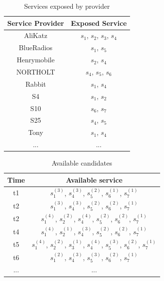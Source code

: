 \documentclass[10pt,journal,compsoc]{IEEEtran}
\begin{document}
\begin{table}[!t]
\renewcommand{\arraystretch}{1.3}
\caption{Services exposed by provider}
\label{Services exposed by provider}
\centering
\begin{tabular}{c c}
\hline
\bfseries Service Provider & \bfseries Exposed Service\\
\hline
AliKatz     & $s_1$, $s_2$, $s_3$, $s_4$\\
BlueRadios  & $s_1$, $s_5$\\
Henrymobile & $s_2$, $s_4$\\
NORTHOLT    & $s_4$, $s_5$, $s_6$ \\
Rabbit      & $s_1$, $s_4$\\
S4          & $s_1$, $s_2$\\
S10         & $s_6$, $s_7$\\
S25         & $s_4$, $s_5$\\
Tony        & $s_1$, $s_4$\\
... & ...\\
\hline
\end{tabular}
\end{table}

\begin{table}[!t]
\renewcommand{\arraystretch}{1.8}
\caption{Available candidates}
\label{Available candidates}
\centering
\begin{tabular}{c c}
\hline
\bfseries Time & \bfseries Available service\\
\hline
t1     & $s_1^{(3)}$, $s_4^{(3)}$, $s_5^{(2)}$, $s_6^{(1)}$, $s_7^{(1)}$ \\
t2     & $s_1^{(3)}$, $s_4^{(3)}$, $s_5^{(2)}$, $s_6^{(2)}$, $s_7^{(1)}$ \\
t2     & $s_1^{(4)}$, $s_2^{(2)}$, $s_4^{(4)}$, $s_5^{(2)}$, $s_6^{(2)}$, $s_7^{(1)}$ \\
t4     & $s_1^{(4)}$, $s_2^{(1)}$, $s_4^{(3)}$, $s_5^{(2)}$, $s_6^{(2)}$, $s_7^{(1)}$ \\
t5     & $s_1^{(4)}$, $s_2^{(2)}$, $s_3^{(1)}$, $s_4^{(4)}$, $s_5^{(3)}$, $s_6^{(2)}$, $s_7^{(1)}$ \\
t6     & $s_1^{(2)}$, $s_4^{(3)}$, $s_5^{(3)}$, $s_6^{(2)}$, $s_7^{(1)}$ \\
... & ...\\
\hline
\end{tabular}
\end{table}
\end{document}
